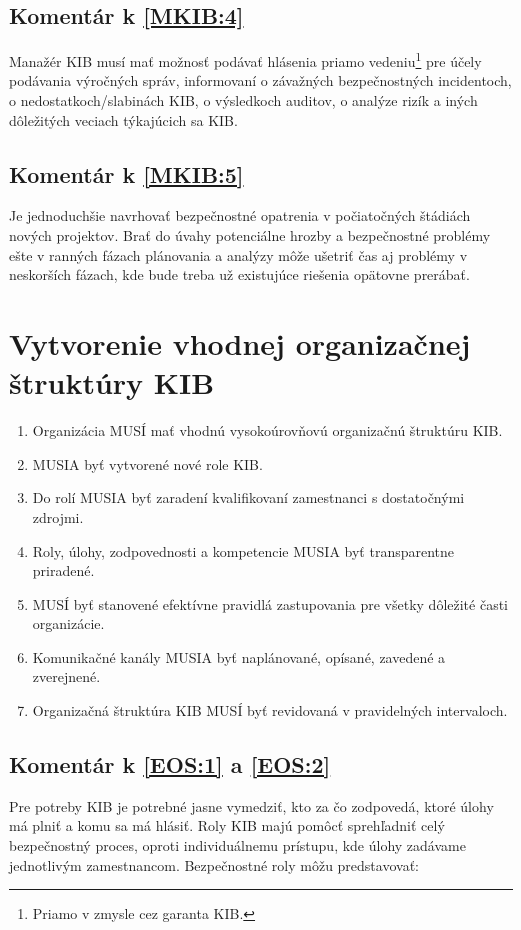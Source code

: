 \subsection*{Komentár k \ref{MKIB:4}}
Manažér KIB musí mať možnosť podávať hlásenia priamo vedeniu\footnote{Priamo v zmysle cez garanta KIB.} pre účely
podávania výročných správ, informovaní o závažných bezpečnostných incidentoch, o nedostatkoch/slabinách KIB,
o výsledkoch auditov, o analýze rizík a iných dôležitých veciach týkajúcich sa KIB.

\subsection*{Komentár k \ref{MKIB:5}}
Je jednoduchšie navrhovať bezpečnostné opatrenia v počiatočných štádiách nových projektov. Brať do úvahy potenciálne hrozby
a bezpečnostné problémy ešte v ranných fázach plánovania a analýzy môže ušetriť čas aj problémy v neskorších fázach, kde
bude treba už existujúce riešenia opätovne prerábať.

\section{Vytvorenie vhodnej organizačnej štruktúry KIB}
\begin{enumerate}
  \item \label{EOS:1} Organizácia MUSÍ mať vhodnú vysokoúrovňovú organizačnú štruktúru KIB.
  \item \label{EOS:2} MUSIA byť vytvorené nové role KIB.
  \item \label{EOS:3} Do rolí MUSIA byť zaradení kvalifikovaní zamestnanci s dostatočnými zdrojmi.
  \item \label{EOS:4} Roly, úlohy, zodpovednosti a kompetencie MUSIA byť transparentne priradené.
  \item \label{EOS:5} MUSÍ byť stanovené efektívne pravidlá zastupovania pre všetky dôležité časti organizácie.
  \item \label{EOS:6} Komunikačné kanály MUSIA byť naplánované, opísané, zavedené a zverejnené.
  \item \label{EOS:7} Organizačná štruktúra KIB MUSÍ byť revidovaná v pravidelných intervaloch.
\end{enumerate}

\subsection*{Komentár k \ref{EOS:1} a \ref{EOS:2}}
Pre potreby KIB je potrebné jasne vymedziť, kto za čo zodpovedá, ktoré úlohy má plniť a komu sa má hlásiť. Roly KIB majú
pomôcť sprehľadniť celý bezpečnostný proces, oproti individuálnemu prístupu, kde úlohy zadávame jednotlivým zamestnancom.
Bezpečnostné roly môžu predstavovať:

